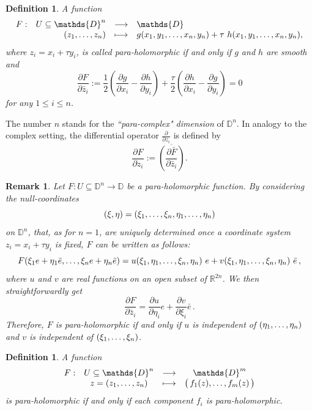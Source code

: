 \documentclass[11pt, reqno]{amsart}
\newtheorem{df}[theor]{Definition}
\newtheorem{rem}[theor]{Remark}
\newcommand{\de}{\partial}
\newcommand{\D}{\mathds{D}}
\newcommand{\R}{\mathds{R}}
\begin{document}
%
\begin{df}
A  function
$$
\begin{array}{rrcl}
F:&U\subseteq \D^n&\longrightarrow&\D\\
& (z_1,\mathellipsis,z_n)&\longmapsto& g(x_1,y_1,\mathellipsis,x_n,y_n)+ \tau\ h(x_1,y_1,\mathellipsis,x_n,y_n),
\end{array}$$ 
where $z_i=x_i+\tau y_i$, is called \emph{para-holomorphic} if and only if $g$ and $h$ are smooth and
\begin{equation*}%
\frac{\de F}{\de\bar z_i}:=\frac{1}{2}\left( \frac{\de g}{\de x_i}-\frac{\de h}{\de y_i}\right)+\frac{\tau}{2}\left( \frac{\de h}{\de x_i}-\frac{\de g}{\de y_i}\right)=0
\end{equation*}
for any $1\leq i\leq n$.
\end{df}
The number $n$ stands for the \emph{``para-complex" dimension} of $\D^n$.
In analogy to the complex setting, the differential operator $\frac{\de}{\de z_i}$ is defined by
\begin{equation*}%
\frac{\de F}{\de z_i}:=\overline{\left( \frac{\de \bar F}{\de \bar z_i}\right)}.
\end{equation*}
\begin{rem}\label{ph1}
Let  $F:U\subseteq \D^n\to\D$ be a para-holomorphic function. By considering the null-coordinates 
$$
(\xi,\eta)=(\xi_1,\mathellipsis,\xi_n,\eta_1,\mathellipsis,\eta_n)
$$ 
on $\D^n$, that, as for $n=1$, are uniquely determined once a coordinate system $z_i=x_i+\tau y_i$ is fixed,
$F$ can be written as follows:
$$
F(\xi_1e+\eta_1\bar e,\mathellipsis,\xi_n e+\eta_n\bar e)=u(\xi_1,\eta_1,\mathellipsis,\xi_n ,\eta_n)\ e+ v(\xi_1,\eta_1,\mathellipsis,\xi_n ,\eta_n)\ \bar e\,,
$$ 
where $u$ and $v$ are real functions on an open subset of $\R^{2n}$. 
We then straightforwardly get
$$
\frac{\de F}{\de\bar z_i}=\frac{\de u}{\de \eta_i}e+\frac{\de v}{\de \xi_i}\bar e\,.
$$
Therefore, $F$ is para-holomorphic if and only if $u$ is independent of $(\eta_1,\mathellipsis,\eta_n)$  and $v$ is independent of  $(\xi_1,\mathellipsis,\xi_n)$.
\end{rem}
\begin{df}\label{ph2}
A function 
$$
\begin{array}{rccc}
F:&U\subseteq \D^n&\longrightarrow&\D^m\\
& z=(z_1,\mathellipsis,z_n)&\longmapsto&\big(\, f_1(z),\mathellipsis,f_m(z)\,\big)
\end{array}
$$ 
is para-holomorphic if and only if each component $f_i$ is para-holomorphic.
\end{df}
\end{document}
